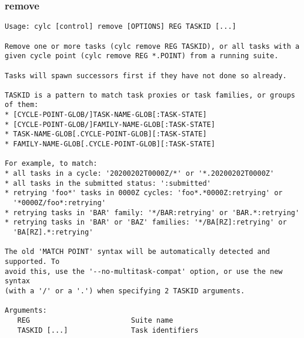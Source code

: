 \subsubsection{remove}
\label{remove}
\begin{lstlisting}
Usage: cylc [control] remove [OPTIONS] REG TASKID [...] 

Remove one or more tasks (cylc remove REG TASKID), or all tasks with a
given cycle point (cylc remove REG *.POINT) from a running suite.

Tasks will spawn successors first if they have not done so already.

TASKID is a pattern to match task proxies or task families, or groups of them:
* [CYCLE-POINT-GLOB/]TASK-NAME-GLOB[:TASK-STATE]
* [CYCLE-POINT-GLOB/]FAMILY-NAME-GLOB[:TASK-STATE]
* TASK-NAME-GLOB[.CYCLE-POINT-GLOB][:TASK-STATE]
* FAMILY-NAME-GLOB[.CYCLE-POINT-GLOB][:TASK-STATE]

For example, to match:
* all tasks in a cycle: '20200202T0000Z/*' or '*.20200202T0000Z'
* all tasks in the submitted status: ':submitted'
* retrying 'foo*' tasks in 0000Z cycles: 'foo*.*0000Z:retrying' or
  '*0000Z/foo*:retrying'
* retrying tasks in 'BAR' family: '*/BAR:retrying' or 'BAR.*:retrying'
* retrying tasks in 'BAR' or 'BAZ' families: '*/BA[RZ]:retrying' or
  'BA[RZ].*:retrying'

The old 'MATCH POINT' syntax will be automatically detected and supported. To
avoid this, use the '--no-multitask-compat' option, or use the new syntax
(with a '/' or a '.') when specifying 2 TASKID arguments.

Arguments:
   REG                        Suite name
   TASKID [...]               Task identifiers


\end{lstlisting}
